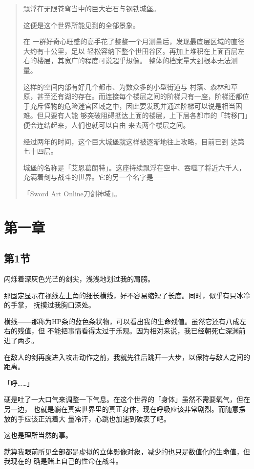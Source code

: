 \documentclass[11pt]{book}
\begin{document}
\begin{quote}
飘浮在无限苍穹当中的巨大岩石与钢铁城堡。

这便是这个世界所能见到的全部景象。

在
一群好奇心旺盛的高手花了整整一个月测量后，发现最底层区域的直径大约有十公里，足以
轻松容纳下整个世田谷区。再加上堆积在上面百层左右的楼层，其宽广的程度可说超乎想像。
整体的档案量大到根本无法测量。

这样的空间内部有好几个都市、为数众多的小型街道与
村落、森林和草原，甚至还有湖的存在。而连接每个楼层之间的阶梯只有一座，阶梯还都位
于充斥怪物的危险迷宫区域之中，因此要发现并通过阶梯可以说是相当困难。但只要有人能
够突破阻碍抵达上面的楼层，上下层各都市的「转移门」便会连结起来，人们也就可以自由
来去两个楼层之间。

经过两年的时间，这个巨大城堡就这样被逐渐地往上攻略，目前已到
达第七十四层。

城堡的名称是「艾恩葛朗特」。这座持续飘浮在空中、吞噬了将近六千人，
充满着剑与战斗的世界。它的另一个名字是——

「Sword Art Online刀剑神域」。
\end{quote}

\chapter{第一章}
\label{sec:org35b493b}
\section{第1节}
\label{sec:org07dd154}
闪烁着深灰色光芒的剑尖，浅浅地划过我的肩膀。

那固定显示在视线左上角的细长横线，好不容易缩短了长度。同时，似乎有只冰冷的手掌，
抚摸过我胸口深处。

横线——那称为HP条的蓝色条状物，可以看出我的生命残值。虽然它还有八成左右的残值，但
不能把事情看得太过于乐观。因为相对来说，我已经朝死亡深渊前进了两步。

在敌人的剑再度进入攻击动作之前，我就先往后跳开一大步，以保持与敌人之间的距离。

「呼……」

硬是吐了一大口气来调整一下气息。在这个世界的「身体」虽然不需要氧气，但在另一边，
也就是躺在真实世界里的真正身体，现在呼吸应该非常剧烈。而随意摆放的手应该正流着大
量冷汗，心跳也加速到破表了吧。

这也是理所当然的事。

就算我眼前所见全部都是虚拟的立体影像对象，减少的也只是数值化的生命值，但我现在的
确是赌上自己的性命在战斗。
\end{document}
